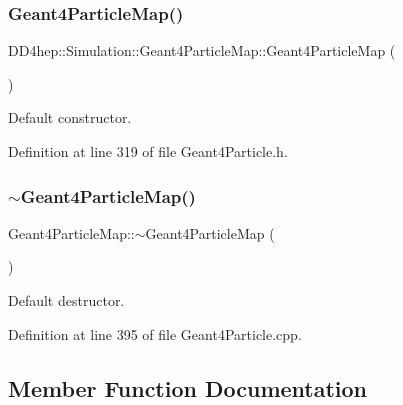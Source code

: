 \subsubsection{\texorpdfstring{Geant4\+Particle\+Map()}{Geant4ParticleMap()}}
{\footnotesize\ttfamily D\+D4hep\+::\+Simulation\+::\+Geant4\+Particle\+Map\+::\+Geant4\+Particle\+Map (\begin{DoxyParamCaption}{ }\end{DoxyParamCaption})\hspace{0.3cm}{\ttfamily [inline]}}



Default constructor. 



Definition at line 319 of file Geant4\+Particle.\+h.

\hypertarget{class_d_d4hep_1_1_simulation_1_1_geant4_particle_map_ab81a69115c8908be2ae5a2cee23bd80e}{}\label{class_d_d4hep_1_1_simulation_1_1_geant4_particle_map_ab81a69115c8908be2ae5a2cee23bd80e} 
\subsubsection{\texorpdfstring{$\sim$\+Geant4\+Particle\+Map()}{~Geant4ParticleMap()}}
{\footnotesize\ttfamily Geant4\+Particle\+Map\+::$\sim$\+Geant4\+Particle\+Map (\begin{DoxyParamCaption}{ }\end{DoxyParamCaption})\hspace{0.3cm}{\ttfamily [virtual]}}



Default destructor. 



Definition at line 395 of file Geant4\+Particle.\+cpp.



\subsection{Member Function Documentation}
\hypertarget{class_d_d4hep_1_1_simulation_1_1_geant4_particle_map_a272d5c51f1c4d6d7b526288f99611811}{}\label{class_d_d4hep_1_1_simulation_1_1_geant4_particle_map_a272d5c51f1c4d6d7b526288f99611811} 
